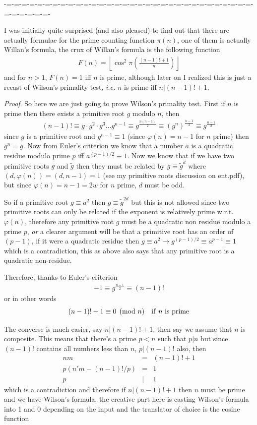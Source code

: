 \documentclass[aps,preprint,preprintnumbers,nofootinbib,showpacs,prd]{revtex4-1}
\newcommand{\ie}{{\it i.e.} }
\newcommand{\nbea}{\begin{eqnarray*}}
\newcommand{\neea}{\end{eqnarray*}}
\begin{document}
-=-=-=-=-=-=-=-=-=-=-=-=-=-=-=-=-=-=-=-=-=-=-=-=-=-=-=-=-=-=-=-=-=-=-=-=-=-=-

I was initially quite surprised (and also pleased) to find out that there are actually formulae for the prime counting function $\pi(n)$, one of them is actually Willan's formula, the crux of Willan's formula is the following function
%
\nbea
F(n) = \left\lfloor{\cos^2 \pi \left(\frac{(n-1)! + 1}{n}\right)}\right\rfloor
\neea
%
and for $n > 1$, $F(n) = 1$ iff $n$ is prime, although later on I realized this is just a recast of Wilson's primality test, \ie $n$ is prime iff $n|(n-1)! + 1$.

{\it Proof}. So here we are just going to prove Wilson's primality test. First if $n$ is prime then there exists a primitive root $g$ modulo $n$, then
%
\nbea
(n-1)! \equiv g\cdot g^2 \cdot g^3 \dots g^{n-1} \equiv g^{\frac{n(n-1)}{2}} \equiv \left(g^n\right)^{\frac{n-1}{2}} \equiv g^{\frac{n-1}{2}}
\neea
%
since $g$ is a primitive root and $g^{n-1} \equiv 1$ (since $\varphi(n) = n-1$ for $n$ prime) then $g^n = g$. Now from Euler's criterion we know that a number $a$ is a quadratic residue modulo prime $p$ iff $a^{(p-1)/2} \equiv 1$. Now we know that if we have two primitive roots $g$ and $\tilde g$ then they must be related by $g \equiv \tilde g^d$ where $(d,\varphi(n)) = (d, n-1) = 1$ (see my primitive roots discussion on ent.pdf),  but since $\varphi(n) = n-1 = 2w$ for $n$ prime, $d$ must be odd.

So if a primitive root $g \equiv a^2$ then $g \equiv \tilde g^{2d}$ but this is not allowed since two primitive roots can only be related if the exponent is relatively prime w.r.t. $\varphi(n)$, therefore any primitive root $g$ must be a quadratic non residue modulo a prime $p$, {\it or} a clearer argument will be that a primitive root has an order of $(p-1)$, if it were a quadratic residue then $g \equiv a^2 \to g^{(p-1)/2} \equiv a^{p-1} \equiv 1$ which is a contradiction, this as above also says that any primitive root is a quadratic non-residue.

Therefore, thanks to Euler's criterion
%
\nbea
-1 \equiv g^{\frac{n-1}{2}} \equiv (n-1)!
\neea
%
or in other words
%
\nbea
(n-1)! + 1 \equiv 0 \pmod{n} ~~~{\rm if~} n {\rm~is~prime}
\neea
%

The converse is much easier, say $n|(n-1)! + 1$, then say we assume that $n$ is composite. This means that there's a prime $p < n$ such that $p|n$ but since $(n-1)!$ contains all numbers less than $n$, $p|(n-1)!$ also, then
%
\nbea
nm & = & (n-1)! + 1 \\
p(n'm - (n-1)!/p) & = & 1 \\
p &|& 1
\neea
%
which is a contradiction and therefore if $n|(n-1)! + 1$ then $n$ must be prime and we have Wilson's formula, the creative part here is casting Wilson's formula into 1 and 0 depending on the input and the translator of choice is the cosine function
\end{document}
